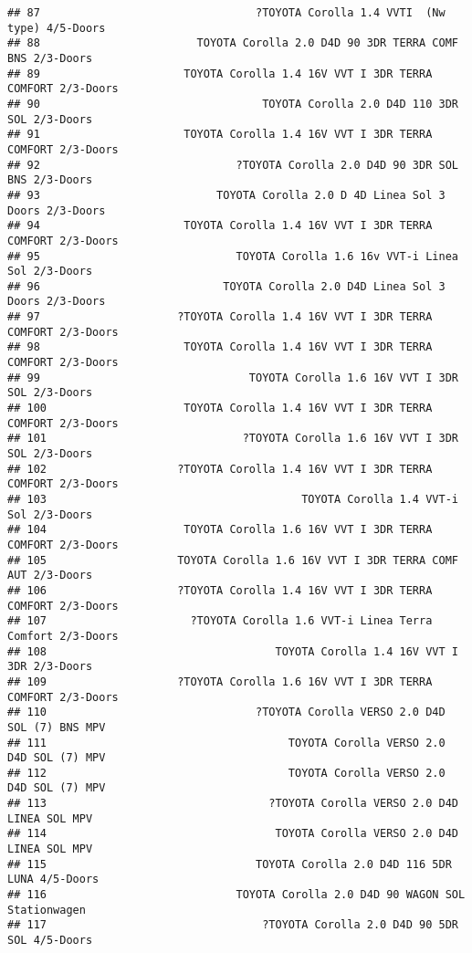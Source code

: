 \documentclass[]{article}
\begin{document}
\begin{verbatim}
## 87                                 ?TOYOTA Corolla 1.4 VVTI  (Nw type) 4/5-Doors
## 88                        TOYOTA Corolla 2.0 D4D 90 3DR TERRA COMF BNS 2/3-Doors
## 89                      TOYOTA Corolla 1.4 16V VVT I 3DR TERRA COMFORT 2/3-Doors
## 90                                  TOYOTA Corolla 2.0 D4D 110 3DR SOL 2/3-Doors
## 91                      TOYOTA Corolla 1.4 16V VVT I 3DR TERRA COMFORT 2/3-Doors
## 92                              ?TOYOTA Corolla 2.0 D4D 90 3DR SOL BNS 2/3-Doors
## 93                           TOYOTA Corolla 2.0 D 4D Linea Sol 3 Doors 2/3-Doors
## 94                      TOYOTA Corolla 1.4 16V VVT I 3DR TERRA COMFORT 2/3-Doors
## 95                              TOYOTA Corolla 1.6 16v VVT-i Linea Sol 2/3-Doors
## 96                            TOYOTA Corolla 2.0 D4D Linea Sol 3 Doors 2/3-Doors
## 97                     ?TOYOTA Corolla 1.4 16V VVT I 3DR TERRA COMFORT 2/3-Doors
## 98                      TOYOTA Corolla 1.4 16V VVT I 3DR TERRA COMFORT 2/3-Doors
## 99                                TOYOTA Corolla 1.6 16V VVT I 3DR SOL 2/3-Doors
## 100                     TOYOTA Corolla 1.4 16V VVT I 3DR TERRA COMFORT 2/3-Doors
## 101                              ?TOYOTA Corolla 1.6 16V VVT I 3DR SOL 2/3-Doors
## 102                    ?TOYOTA Corolla 1.4 16V VVT I 3DR TERRA COMFORT 2/3-Doors
## 103                                       TOYOTA Corolla 1.4 VVT-i Sol 2/3-Doors
## 104                     TOYOTA Corolla 1.6 16V VVT I 3DR TERRA COMFORT 2/3-Doors
## 105                    TOYOTA Corolla 1.6 16V VVT I 3DR TERRA COMF AUT 2/3-Doors
## 106                    ?TOYOTA Corolla 1.4 16V VVT I 3DR TERRA COMFORT 2/3-Doors
## 107                      ?TOYOTA Corolla 1.6 VVT-i Linea Terra Comfort 2/3-Doors
## 108                                   TOYOTA Corolla 1.4 16V VVT I 3DR 2/3-Doors
## 109                    ?TOYOTA Corolla 1.6 16V VVT I 3DR TERRA COMFORT 2/3-Doors
## 110                                ?TOYOTA Corolla VERSO 2.0 D4D SOL (7) BNS MPV
## 111                                     TOYOTA Corolla VERSO 2.0 D4D SOL (7) MPV
## 112                                     TOYOTA Corolla VERSO 2.0 D4D SOL (7) MPV
## 113                                  ?TOYOTA Corolla VERSO 2.0 D4D LINEA SOL MPV
## 114                                   TOYOTA Corolla VERSO 2.0 D4D LINEA SOL MPV
## 115                                TOYOTA Corolla 2.0 D4D 116 5DR LUNA 4/5-Doors
## 116                             TOYOTA Corolla 2.0 D4D 90 WAGON SOL Stationwagen
## 117                                 ?TOYOTA Corolla 2.0 D4D 90 5DR SOL 4/5-Doors

\end{verbatim}
\end{document}
